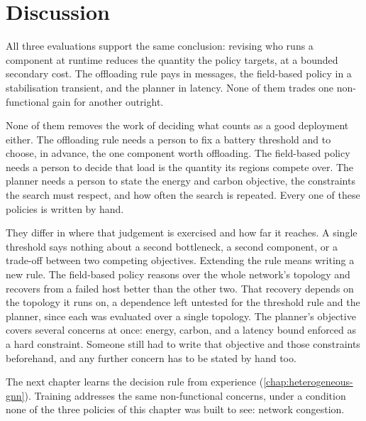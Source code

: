 \section{Discussion}
\label{sec:deployment-reconfiguration-discussion}

All three evaluations support the same conclusion:
revising who runs a component at runtime reduces the quantity the policy targets, at a bounded secondary cost.
%
The offloading rule pays in messages, the field-based policy in a stabilisation transient, and the planner in latency.
%
None of them trades one non-functional gain for another outright.

None of them removes the work of deciding what counts as a good deployment either.
%
The offloading rule needs a person to fix a battery threshold and to choose, in advance, the one component worth offloading.
%
The field-based policy needs a person to decide that load is the quantity its regions compete over.
%
The planner needs a person to state the energy and carbon objective, the constraints the search must respect, and how often the search is repeated.
%
Every one of these policies is written by hand.

They differ in where that judgement is exercised and how far it reaches.
%
A single threshold says nothing about a second bottleneck, a second component, or a trade-off between two competing objectives.
Extending the rule means writing a new rule.
%
The field-based policy reasons over the whole network's topology and recovers from a failed host better than the other two.
That recovery depends on the topology it runs on, a dependence left untested for the threshold rule and the planner, since each was evaluated over a single topology.
%
The planner's objective covers several concerns at once: energy, carbon, and a latency bound enforced as a hard constraint.
Someone still had to write that objective and those constraints beforehand, and any further concern has to be stated by hand too.

The next chapter learns the decision rule from experience (\cref{chap:heterogeneous-gnn}).
%
Training addresses the same non-functional concerns,
under a condition none of the three policies of this chapter was built to see: network congestion.
